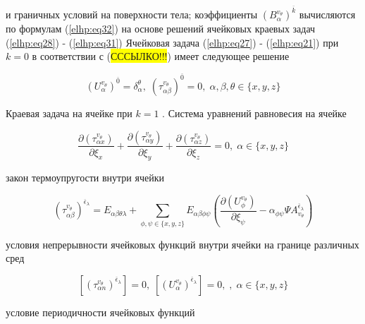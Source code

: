 и граничных условий на поверхности тела; коэффициенты
$ \left( B_{\alpha}^{ v_{\theta}} \right)^{ \overline{k}} $
вычисляются по формулам
(\ref{elhp:eq32})
на основе решений ячейковых краевых задач 
(\ref{elhp:eq28})
-
(\ref{elhp:eq31})
Ячейковая задача 
(\ref{elhp:eq27})
-
(\ref{elhp:eq21})
при $k=0$ в соответствии с (\colorbox{yellow}{СССЫЛКО!!!}) имеет следующее решение

\begin{equation}
    \label{elhp:eq38}
    \left( U_{\alpha}^{v_{\theta}} \right)^{ \overline{0} } = \delta_{\alpha}^{\theta}
    ,\;
    \left( \tau_{\alpha\beta}^{v_{\theta}} \right)^{ \overline{0} } = 0
    ,\;
    \alpha,\beta,\theta \in \{x,y,z\} 
\end{equation}

Краевая задача на ячейке при 
$k=1$
. Система уравнений равновесия на ячейке

\begin{equation}
    \label{elhp:eq39}
    \frac{\partial \left(  \tau_{\alpha x}^{v_{\theta}}\right) }{\partial \xi_x} +
    \frac{\partial \left(  \tau_{\alpha y}^{v_{\theta}}\right) }{\partial \xi_y} +
    \frac{\partial \left(  \tau_{\alpha z}^{v_{\theta}}\right) }{\partial \xi_z} = 0
    ,\;
    \alpha \in \{x,y,z\} 
\end{equation}

закон термоупругости внутри ячейки

\begin{equation}
    \label{elhp:eq40}
    \left( \tau_{\alpha\beta}^{v_{\theta}} \right)^{ \overline{\epsilon}_{\lambda} } =
    E_{\alpha\beta\theta\lambda} +
    \sum_{ \phi,\psi \in \{x,y,z\} } E_{\alpha\beta\phi\psi}
    \left( 
        \frac{\partial \left( U_{\phi}^{v_{\theta}} \right) }{\partial \xi_{\psi}} - \alpha_{\phi\psi} \Psi A_{v_{\theta}}^{ \overline{\epsilon}_{\lambda}} 
    \right) 
\end{equation}

условия непрерывности ячейковых функций внутри ячейки на границе различных сред

\begin{equation}
    \label{elhp:eq41}
    \left[ \left( \tau_{\alpha n}^{v_{\theta}} \right)^{ \overline{\epsilon}_{\lambda} }  \right] = 0
    ,\;
    \left[ \left( U_{\alpha}^{v_{\theta}} \right)^{ \overline{\epsilon}_{\lambda} }  \right] = 0
    ,\;
    , \; \alpha \in \{x,y,z\}
\end{equation}

условие периодичности ячейковых функций

